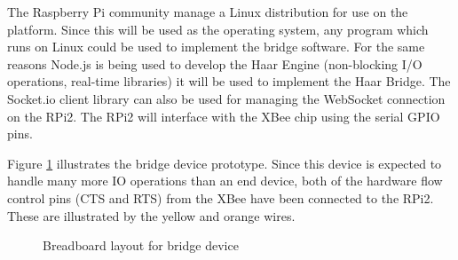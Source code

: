         The Raspberry Pi community manage a Linux distribution for use on the platform. Since this will be used as the operating system, any program which runs on Linux could be used to implement the bridge software. For the same reasons Node.js is being used to develop the Haar Engine (non-blocking I/O operations, real-time libraries) it will be used to implement the Haar Bridge. The Socket.io client library can also be used for managing the WebSocket connection on the RPi2. The RPi2 will interface with the XBee chip using the serial GPIO pins.

        Figure \ref{figure:bridge} illustrates the bridge device prototype. Since this device is expected to handle many more IO operations than an end device, both of the hardware flow control pins (CTS and RTS) from the XBee have been connected to the RPi2. These are illustrated by the yellow and orange wires.

        \begin{figure}
          \centering
          \caption{Breadboard layout for bridge device}
          \label{figure:bridge}
        \end{figure}
